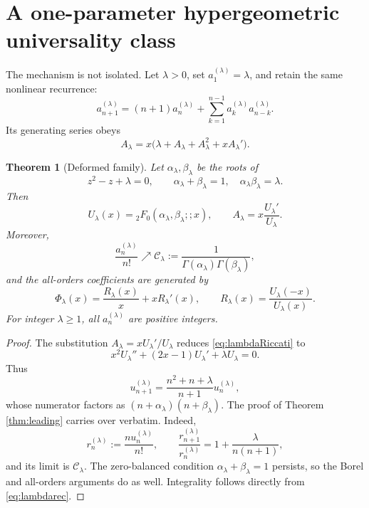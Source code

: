 \documentclass[11pt,a4paper]{article}
\newtheorem{theorem}{Theorem}[section]
\theoremstyle{definition}
\theoremstyle{remark}
\newcommand{\constC}{\mathcal{C}}
\begin{document}
\section{A one-parameter hypergeometric universality class}

The mechanism is not isolated.  Let \(\lambda>0\), set \(a^{(\lambda)}_1=\lambda\), and retain the same nonlinear recurrence:
\begin{equation}\label{eq:lambdarec}
 a^{(\lambda)}_{n+1}=(n+1)a^{(\lambda)}_n
 +\sum_{k=1}^{n-1}a^{(\lambda)}_ka^{(\lambda)}_{n-k}.
\end{equation}
Its generating series obeys
\begin{equation}\label{eq:lambdaRiccati}
 A_\lambda=x\bigl(\lambda+A_\lambda+A_\lambda^2+xA_\lambda'\bigr).
\end{equation}

\begin{theorem}[Deformed family]\label{thm:lambda}
Let \(\alpha_\lambda,\beta_\lambda\) be the roots of
\begin{equation}\label{eq:lambdaroots}
 z^2-z+\lambda=0,
 \qquad
 \alpha_\lambda+\beta_\lambda=1,
 \quad \alpha_\lambda\beta_\lambda=\lambda.
\end{equation}
Then
\begin{equation}\label{eq:lambdaU}
 U_\lambda(x)={}_2F_0(\alpha_\lambda,\beta_\lambda;;x),
 \qquad
 A_\lambda=x\frac{U_\lambda'}{U_\lambda}.
\end{equation}
Moreover,
\begin{equation}\label{eq:lambdalimit}
 \frac{a_n^{(\lambda)}}{n!}\nearrow
 \constC_\lambda:=\frac{1}{\Gamma(\alpha_\lambda)
                              \Gamma(\beta_\lambda)},
\end{equation}
and the all-orders coefficients are generated by
\begin{equation}\label{eq:lambdaPhi}
 \Phi_\lambda(x)=\frac{R_\lambda(x)}{x}+xR_\lambda'(x),
 \qquad
 R_\lambda(x)=\frac{U_\lambda(-x)}{U_\lambda(x)}.
\end{equation}
For integer \(\lambda\ge1\), all \(a_n^{(\lambda)}\) are positive integers.
\end{theorem}

\begin{proof}
The substitution \(A_\lambda=xU_\lambda'/U_\lambda\) reduces \eqref{eq:lambdaRiccati} to
\[
 x^2U_\lambda''+(2x-1)U_\lambda'+\lambda U_\lambda=0.
\]
Thus
\[
 u_{n+1}^{(\lambda)}=\frac{n^2+n+\lambda}{n+1}u_n^{(\lambda)},
\]
whose numerator factors as \((n+\alpha_\lambda)(n+\beta_\lambda)\).  The proof of Theorem \ref{thm:leading} carries over verbatim.  Indeed,
\[
 r_n^{(\lambda)}:=\frac{nu_n^{(\lambda)}}{n!},
 \qquad
 \frac{r_{n+1}^{(\lambda)}}{r_n^{(\lambda)}}
 =1+\frac{\lambda}{n(n+1)},
\]
and its limit is \(\constC_\lambda\).  The zero-balanced condition \(\alpha_\lambda+\beta_\lambda=1\) persists, so the Borel and all-orders arguments do as well.  Integrality follows directly from \eqref{eq:lambdarec}.
\end{proof}
\end{document}
